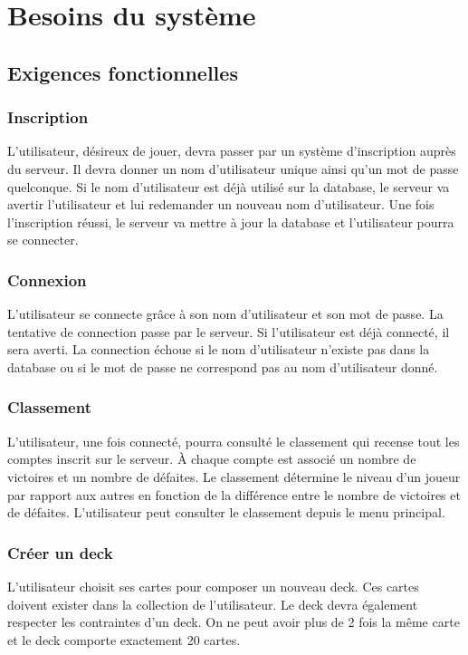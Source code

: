 \chapter{Besoins du système}
\section{Exigences fonctionnelles}
\subsection{Inscription}
{L'utilisateur, désireux de jouer, devra passer par un système d'inscription auprès du serveur. Il devra donner un nom d'utilisateur unique ainsi qu'un mot de passe quelconque. Si le nom d'utilisateur est déjà utilisé sur la database, le serveur va avertir l'utilisateur et lui redemander un nouveau nom d'utilisateur. Une fois l'inscription réussi, le serveur va mettre à jour la database et l'utilisateur pourra se connecter.}
\subsection{Connexion}
{L'utilisateur se connecte grâce à son nom d'utilisateur et son mot de passe. La tentative de connection passe par le serveur. Si l'utilisateur est déjà connecté, il sera averti. La connection échoue si le nom d'utilisateur n'existe pas dans la database ou si le mot de passe ne correspond pas au nom d'utilisateur donné.}
\subsection{Classement}
{L'utilisateur, une fois connecté, pourra consulté le classement qui recense tout les comptes inscrit sur le serveur. À chaque compte est associé un nombre de victoires et un nombre de défaites. Le classement détermine le niveau d'un joueur par rapport aux autres en fonction de la différence entre le nombre de victoires et de défaites. L'utilisateur peut consulter le classement depuis le menu principal.}
\subsection{Créer un deck}
{L'utilisateur choisit ses cartes pour composer un nouveau deck. Ces cartes doivent exister dans la collection  de l'utilisateur. Le deck devra également respecter les contraintes d'un deck. On ne peut avoir plus de 2 fois la même carte et le deck comporte exactement 20 cartes.}
